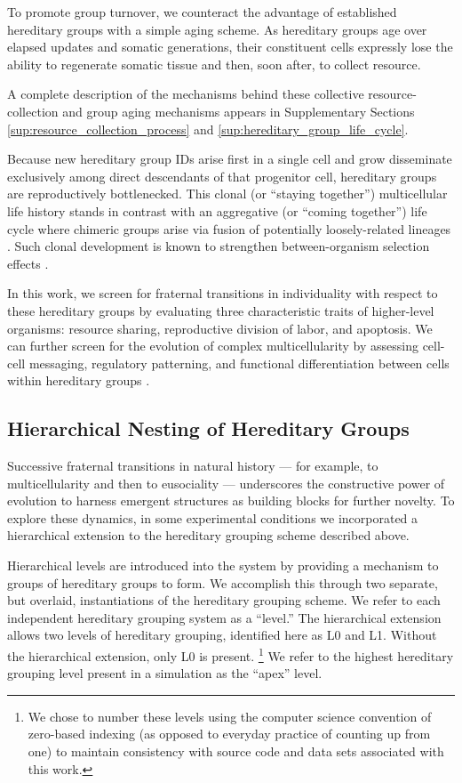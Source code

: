 To promote group turnover, we counteract the advantage of established hereditary groups with a simple aging scheme.
As hereditary groups age over elapsed updates and somatic generations, their constituent cells expressly lose the ability to regenerate somatic tissue and then, soon after, to collect resource.

A complete description of the mechanisms behind these collective resource-collection and group aging mechanisms appears in Supplementary Sections \ref{sup:resource_collection_process} and \ref{sup:hereditary_group_life_cycle}.

Because new hereditary group IDs arise first in a single cell and grow disseminate exclusively among direct descendants of that progenitor cell, hereditary groups are reproductively bottlenecked.
This clonal (or ``staying together'') multicellular life history stands in contrast with an aggregative (or ``coming together'') life cycle where chimeric groups arise via fusion of potentially loosely-related lineages \citep{staps2019emergence}.
Such clonal development is known to strengthen between-organism selection effects \citep{grosberg2007evolution}.

In this work, we screen for fraternal transitions in individuality with respect to these hereditary groups by evaluating three characteristic traits of higher-level organisms: resource sharing, reproductive division of labor, and apoptosis.
We can further screen for the evolution of complex multicellularity by assessing cell-cell messaging, regulatory patterning, and functional differentiation between cells within hereditary groups \cite{knoll2011multiple}.

\subsection{Hierarchical Nesting of Hereditary Groups} \label{sec:hierarchical_nesting}

Successive fraternal transitions in natural history --- for example, to multicellularity and then to eusociality \citep{smith1997major} --- underscores the constructive power of evolution to harness emergent structures as building blocks for further novelty.
To explore these dynamics, in some experimental conditions we incorporated a hierarchical extension to the hereditary grouping scheme described above.

Hierarchical levels are introduced into the system by providing a mechanism to groups of hereditary groups to form.
We accomplish this through two separate, but overlaid, instantiations of the hereditary grouping scheme.
We refer to each independent hereditary grouping system as a ``level.''
The hierarchical extension allows two levels of hereditary grouping, identified here as L0 and L1.
Without the hierarchical extension, only L0 is present.
\footnote{
We chose to number these levels using the computer science convention of zero-based indexing (as opposed to everyday practice of counting up from one) to maintain consistency with source code and data sets associated with this work.
}
We refer to the highest hereditary grouping level present in a simulation as the ``apex'' level.

